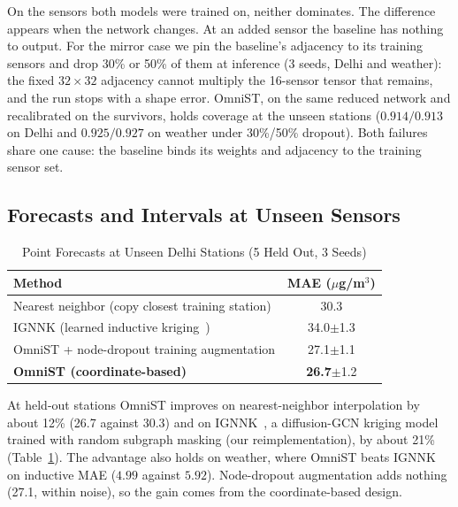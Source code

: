 \documentclass[journal,twoside,web]{ieeecolor}
\begin{document}
On the sensors both models were trained on, neither dominates. The difference appears when the
network changes. At an added sensor the baseline has nothing to output. For the mirror case we pin
the baseline's adjacency to its training sensors and drop 30\% or 50\% of them at inference (3 seeds,
Delhi and weather): the fixed $32{\times}32$ adjacency cannot multiply the 16-sensor tensor that
remains, and the run stops with a shape error. OmniST, on the same reduced network and recalibrated on
the survivors, holds coverage at the unseen stations ($0.914/0.913$ on Delhi and $0.925/0.927$ on
weather under 30\%/50\% dropout). Both failures share one cause: the baseline binds its weights and
adjacency to the training sensor set.

\subsection{Forecasts and Intervals at Unseen Sensors}
\label{sec:conformal-results}

\begin{table}[htbp]
\caption{Point Forecasts at Unseen Delhi Stations (5 Held Out, 3 Seeds)}
\centering
\begin{tabular}{lc}
\toprule
\textbf{Method} & \textbf{MAE ($\mu$g/m$^3$)} \\
\midrule
Nearest neighbor (copy closest training station) & 30.3 \\
IGNNK (learned inductive kriging~\cite{ignnk2020}) & 34.0$\pm$1.3 \\
OmniST + node-dropout training augmentation & 27.1$\pm$1.1 \\
\textbf{OmniST (coordinate-based)} & \textbf{26.7}$\pm$1.2 \\
\bottomrule
\end{tabular}
\label{tab:inductive}
\end{table}

At held-out stations OmniST improves on nearest-neighbor interpolation by about 12\% (26.7 against
30.3) and on IGNNK~\cite{ignnk2020}, a diffusion-GCN kriging model trained with random subgraph
masking (our reimplementation), by about 21\% (Table~\ref{tab:inductive}). The advantage also holds
on weather, where OmniST beats IGNNK on inductive MAE ($4.99$ against $5.92$). Node-dropout
augmentation adds nothing (27.1, within noise), so the gain comes from the coordinate-based design.
\end{document}
